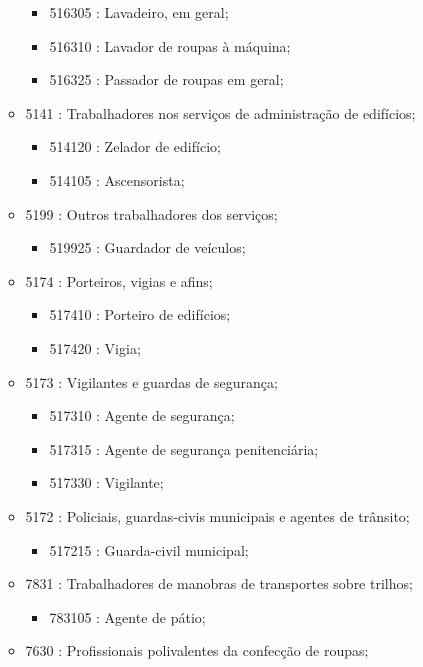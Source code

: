 \begin{itemize}
\begin{itemize}
\begin{itemize}
      \item 516305 : Lavadeiro, em geral;
      \item 516310 : Lavador de roupas à máquina;
      \item 516325 : Passador de roupas em geral;
    \end{itemize}
    \item 5141 : Trabalhadores nos serviços de administração de edifícios;
    \begin{itemize}
      \item 514120 : Zelador de edifício;
      \item 514105 : Ascensorista;
    \end{itemize}
    \item 5199 : Outros trabalhadores dos serviços;
    \begin{itemize}
      \item 519925 : Guardador de veículos;
    \end{itemize}
    \item 5174 : Porteiros, vigias e afins;
    \begin{itemize}
      \item 517410 : Porteiro de edifícios;
      \item 517420 : Vigia;
    \end{itemize}
    \item 5173 : Vigilantes e guardas de segurança;
    \begin{itemize}
      \item 517310 : Agente de segurança;
      \item 517315 : Agente de segurança penitenciária;
      \item 517330 : Vigilante;
    \end{itemize}
    \item 5172 : Policiais, guardas-civis municipais e agentes de trânsito;
    \begin{itemize}
      \item 517215 : Guarda-civil municipal;
    \end{itemize}
    \item 7831 : Trabalhadores de manobras de transportes sobre trilhos;
    \begin{itemize}
      \item 783105 : Agente de pátio;
    \end{itemize}
    \item 7630 : Profissionais polivalentes da confecção de roupas;
    \begin{itemize}

\end{itemize}
\end{itemize}
\end{itemize}
